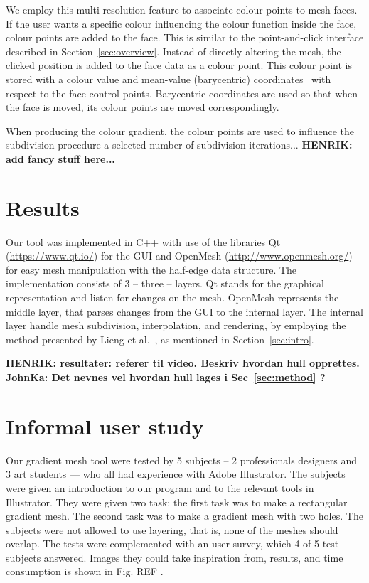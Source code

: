 \documentclass{egpubl}
\newcommand{\note}[3]{{\color{#2}\textbf{#1: #3}}}
\newcommand{\henrik}[1]{\note{HENRIK}{WildStrawberry}{#1}}
\newcommand{\john}[1]{\note{JohnKa}{ForestGreen}{#1}}
\begin{document}
We employ this multi-resolution feature to associate colour points to mesh faces. If the user wants a specific colour influencing the colour function inside the face, colour points are added to the face. This is similar to the point-and-click interface described in Section~\ref{sec:overview}. Instead of directly altering the mesh, the clicked position is added to the face data as a colour point. This colour point is stored with a colour value and mean-value (barycentric) coordinates~\cite{Floater:2003} with respect to the face control points. Barycentric coordinates are used so that when the face is moved, its colour points are moved correspondingly.

When producing the colour gradient, the colour points are used to influence the subdivision procedure a selected number of subdivision iterations... \henrik{add fancy stuff here...}

\section{Results}
\label{sec:results}

Our tool was implemented in C++ with use of the libraries Qt (\url{https://www.qt.io/}) for the GUI and OpenMesh (\url{http://www.openmesh.org/}) for easy mesh manipulation with the half-edge data structure. The implementation consists of 3 -- three -- layers. Qt stands for the graphical representation and listen for changes on the mesh. OpenMesh represents the middle layer, that parses changes from the GUI to the internal layer. The internal layer handle mesh subdivision, interpolation, and rendering, by employing the method presented by Lieng et al.~\cite{Lieng:2016}, as mentioned in Section~\ref{sec:intro}.

\henrik{resultater: referer til video. Beskriv hvordan hull opprettes.}
\john{Det nevnes vel hvordan hull lages i Sec~\ref{sec:method} ?}

\section{Informal user study}
\label{sec:evaluation}

Our gradient mesh tool were tested by 5 subjects -- 2 professionals designers and 3 art students --- who all had experience with Adobe Illustrator. The subjects were given an introduction to our program and to the relevant tools in Illustrator. They were given two task; the first task was to make a rectangular gradient mesh. The second task was to make a gradient mesh with two holes. The subjects were not allowed to use layering, that is, none of the meshes should overlap. The tests were complemented with an user survey, which 4 of 5 test subjects answered. Images they could take inspiration from, results, and time consumption is shown in Fig. REF . 
\end{document}
